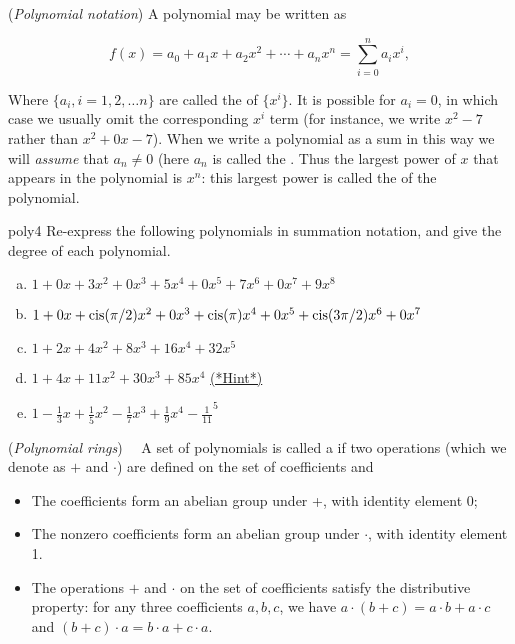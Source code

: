 \begin{defn} (\emph{Polynomial notation}) A polynomial may be written as

\[f(x) = a_0 + a_1 x +a_2 x^2 + \cdots + a_n x^n = \sum^{n}_{i=0} a_i x^i, \]

Where $\{ a_i ,  i=1,2,\ldots n\}$ are called the   of $\{x^i\}$. It is possible for $a_i = 0$, in which case we usually omit the corresponding $x^i$ term (for instance, we write $x^2 -7$ rather than $x^2 + 0x -7$). When we write a polynomial as a sum in this way we will \emph{assume} that $a_n \neq 0$ (here $a_n$ is called the .  Thus the largest power of $x$ that appears in the polynomial is $x^n$: this largest power is called the  of the polynomial.
\end{defn}
\begin{exercise}{poly4}
Re-express the following polynomials in summation notation,  and give the degree of each polynomial.
\begin{enumerate}[(a)]
\item
$1 + 0x + 3x^2 + 0x^3 + 5x^4 + 0x^5 + 7x^6 +0x^7 +  9x^8$
\item
$1 + 0x + \operatorname{cis}(\pi/2)x^2 + 0x^3 + \operatorname{cis}(\pi)x^4 + 0x^5  + \operatorname{cis}(3\pi/2)x^6 + 0x^7$
\item
$1+ 2x + 4x^2 + 8x^3 + 16x^4 + 32x^5$
\item
$1+4x+11x^2+30x^3+85x^4$
\hyperref[sec:polyrings:hints]{(*Hint*)} 
\item
$1-\frac{1}{3}x + \frac{1}{5}x^2 - \frac{1}{7}x^3 + \frac{1}{9}x^4 - \frac{1}{11}^5$
\end{enumerate}
\end{exercise}


\begin{defn} \label{def:polyring}(\emph{Polynomial rings})~~
A set of polynomials is called a  if two operations (which we denote as $+$ and $\cdot$)  are defined on the set of coefficients and
\begin{itemize}
\item
The coefficients form an abelian group under +, with identity element 0;
\item
The nonzero coefficients form an abelian group under $\cdot$, with identity element 1.
\item The operations $+$ and $\cdot$ on the set of coefficients satisfy the distributive property: for any three coefficients $a,b,c$, we have $a \cdot (b + c) = a \cdot b + a \cdot c$ and 
$(b + c) \cdot a = b \cdot a + c \cdot a$.
\end{itemize}
\end{defn}

